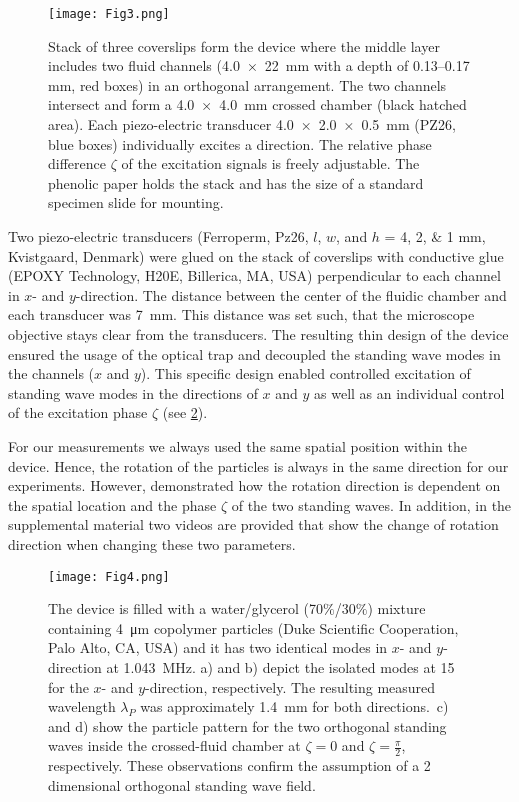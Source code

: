 \begin{figure}
    \centering
    \texttt{[image: Fig3.png]}
    \caption{Stack of three coverslips form the device where the middle layer 
    includes two fluid channels (\SI{4.0x22}{\mm} with a depth of 
    \numrange{0.13}{0.17} \si{\milli\meter}, red boxes) in an orthogonal 
    arrangement. The two channels intersect and form a \SI{4.0x4.0}{\mm} crossed 
    chamber (black hatched area). Each piezo-electric transducer 
    \SI{4.0x2.0x0.5}{\mm} (PZ26, blue boxes) individually excites a direction.  
    The relative phase difference $\zeta$ of the excitation signals is freely 
    adjustable. The phenolic paper holds the stack and has the size of a 
    standard specimen slide for mounting.\label{fig:Fig3}}
\end{figure}

Two piezo-electric transducers (Ferroperm, Pz26, $l$, $w$, and $h$ = \numlist{4; 
2; 1} \si{\mm}, Kvistgaard, Denmark) were glued on the stack of coverslips with 
conductive glue (EPOXY Technology, H20E, Billerica, MA, USA) perpendicular to 
each channel in $x$- and $y$-direction. The distance between the center of the 
fluidic chamber and each transducer was \SI{7}{\mm}. This distance was set such, 
that the microscope objective stays clear from the transducers. The resulting 
thin design of the device ensured the usage of the optical trap and decoupled 
the standing wave modes in the channels ($x$ and $y$). This specific design 
enabled controlled excitation of standing wave modes in the directions of $x$ 
and $y$ as well as an individual control of the excitation phase $\zeta$ (see 
\cref{fig:Fig4}).

For our measurements we always used the same spatial position within the device.  
Hence, the rotation of the particles is always in the same direction for our 
experiments. However, \citeauthor{lamprecht2015} \cite{lamprecht2015} 
demonstrated how the rotation direction is dependent on the spatial location and 
the phase $\zeta$ of the two standing waves. In addition, in the supplemental 
material two videos are provided that show the change of rotation direction when 
changing these two parameters.

\begin{figure}
    \centering
    \texttt{[image: Fig4.png]}
    \caption{The device is filled with a water/glycerol (70$\%$/30$\%$) mixture 
    containing \SI{4}{\micro\meter} copolymer particles (Duke Scientific 
    Cooperation, Palo Alto, CA, USA) and it has two identical modes in $x$- and 
    $y$-direction at \SI{1.043}{\mega\hertz}. a) and b) depict the isolated 
    modes at \SI{15}{\Vrms} for the $x$- and $y$-direction, respectively. The 
    resulting measured wavelength $\lambda_{P}$ was approximately 
    \SI{1.4}{\milli\meter} for both directions.\ c) and d) show the particle 
    pattern for the two orthogonal standing waves inside the crossed-fluid 
    chamber at $\zeta= 0$ and $\zeta= \frac{\pi}{2}$, respectively. These 
    observations confirm the assumption of a 2 dimensional orthogonal standing 
    wave field.\label{fig:Fig4}}
\end{figure}


